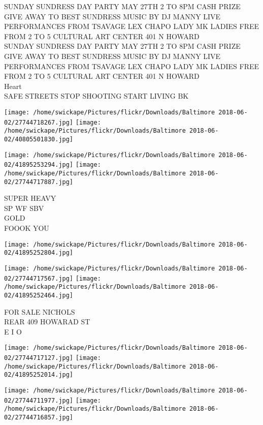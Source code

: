 \documentclass[10pt,letterpaper]{article}
\begin{document}
SUNDAY SUNDRESS DAY PARTY MAY 27TH 2 TO 8PM CASH PRIZE GIVE AWAY TO BEST SUNDRESS MUSIC BY DJ MANNY LIVE PERFORMANCES FROM TSAVAGE LEX CHAPO LADY MK LADIES FREE FROM 2 TO 5 CULTURAL ART CENTER 401 N HOWARD\\
SUNDAY SUNDRESS DAY PARTY MAY 27TH 2 TO 8PM CASH PRIZE GIVE AWAY TO BEST SUNDRESS MUSIC BY DJ MANNY LIVE PERFORMANCES FROM TSAVAGE LEX CHAPO LADY MK LADIES FREE FROM 2 TO 5 CULTURAL ART CENTER 401 N HOWARD\\
Heart\\
SAFE STREETS STOP SHOOTING START LIVING BK\\
\pagebreak

\texttt{[image: /home/swickape/Pictures/flickr/Downloads/Baltimore 2018-06-02/27744718267.jpg]}
\texttt{[image: /home/swickape/Pictures/flickr/Downloads/Baltimore 2018-06-02/40805501830.jpg]}

\texttt{[image: /home/swickape/Pictures/flickr/Downloads/Baltimore 2018-06-02/41895253294.jpg]}
\texttt{[image: /home/swickape/Pictures/flickr/Downloads/Baltimore 2018-06-02/27744717887.jpg]}

SUPER HEAVY\\
SP WF SBV\\
GOLD\\
FOOOK YOU\\
\pagebreak

\texttt{[image: /home/swickape/Pictures/flickr/Downloads/Baltimore 2018-06-02/41895252804.jpg]}

\vspace{0.25in}
\texttt{[image: /home/swickape/Pictures/flickr/Downloads/Baltimore 2018-06-02/27744717567.jpg]}
\texttt{[image: /home/swickape/Pictures/flickr/Downloads/Baltimore 2018-06-02/41895252464.jpg]}

FOR SALE NICHOLS\\
REAR 409 HOWARAD ST\\
E I O\\
\pagebreak

\texttt{[image: /home/swickape/Pictures/flickr/Downloads/Baltimore 2018-06-02/27744717127.jpg]}
\texttt{[image: /home/swickape/Pictures/flickr/Downloads/Baltimore 2018-06-02/41895252014.jpg]}

\texttt{[image: /home/swickape/Pictures/flickr/Downloads/Baltimore 2018-06-02/27744711977.jpg]}
\texttt{[image: /home/swickape/Pictures/flickr/Downloads/Baltimore 2018-06-02/27744716857.jpg]}
\end{document}
